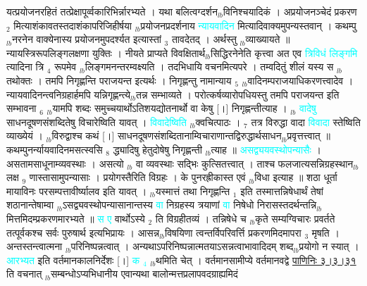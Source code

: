 \documentclass[article,12pt,a4paper]{memoir}%
\newcommand{\quotelemma}[1]{\textcolor{cyan}{#1}}
\begin{document}
	  
	  \pstart \leavevmode%
	यत्प्रयोजनरहितं तत्प्रेक्षापूर्व्वकारिभिर्न्नारभ्यते । यथा बलित्वग्दर्शन{\tiny $_{lb}$}विनिश्चयादिकं । अप्रयोजनञ्चेदं प्रकरण {\tiny $_{2}$} मित्याशंकावतस्तदाशंकापरिजिहीर्षया {\tiny $_{lb}$}प्रयोजनप्रदर्शनाय \quotelemma{न्यायवादिन} \cite[1b1]{vn-msN} मित्यादिवाक्यमुपन्यस्तवान् । कथम्पु{\tiny $_{lb}$}नरनेन वाक्येनास्य प्रयोजनमुपदर्श्यत इत्यास्तां {\tiny $_{3}$} तावदेतद् । अर्थस्तु {\tiny $_{lb}$}व्याख्यायते ॥ न्यायस्त्रिरूपलिङ्गलक्षणा युक्तिः । नीयते प्राप्यते विवक्षितार्थ{\tiny $_{lb}$}सिद्धिरनेनेति कृत्त्वा अत एव \quotelemma{त्रिविधं लिङ्गमि}\cite[1b2]{vn-msN} त्यादिना त्रि {\tiny $_{4}$} रूपमेव {\tiny $_{lb}$}लिङ्गमनन्तरम्वक्ष्यति । तदभिधायि वचनमित्यपरे । तम्वदितुं शीलं यस्य स {\tiny $_{lb}$}तथोक्तः । तमपि निगृह्णन्ति पराजयन्त इत्यर्थः । निगृह्णन्तु नामान्याय {\tiny $_{5}$} {\tiny $_{lb}$}वादिनम्पराजयाधिकरणत्त्वादेव । न्यायवादिनन्त्वनिग्रहार्हमपि यन्निगृह्णन्त्ये{\tiny $_{lb}$}तन्न सम्भाव्यते । परोत्कर्षव्यारोपधियस्तु तमपि पराजयन्त इति सम्भावना {\tiny $_{6}$} {\tiny $_{lb}$}यामपि शब्दः समुच्चयार्थोऽतिशयद्योतनार्थो वा केषु [।] निगृह्णन्तीत्याह । {\tiny $_{lb}$} \quotelemma{वादेषु} \cite[1b1]{vn-msN} साधनदूषणसंशब्दितेषु विचारेष्विति यावत् । \quotelemma{विवादेष्विति} {\tiny $_{lb}$}क्वचित्पाठः । {\tiny $_{7}$} तत्र विरुद्धा वादा \quotelemma{विवादा} स्तेष्विति व्याख्येयं । {\tiny $_{lb}$}विरुद्वाश्च कथं [।] साधनदूषणसंशब्दितानाम्विचाराणान्तद्विरुद्धार्थसाधन{\tiny $_{lb}$}प्रवृत्तत्त्वात् ॥ कथम्पुनर्न्यायवादिनमसत्स्वसि {\tiny $_{8}$} द्ध्यादिषु हेतुदोषेषु निगृह्णन्ती {\tiny $_{lb}$}त्याह ॥ \quotelemma{असद्व्ययवस्थोपन्यासैः} । \cite[1b1]{vn-msN} असतामसाधूनाम्व्यवस्थाः । असत्यो {\tiny $_{lb}$} \leavevmode{} वा व्यवस्थाः सद्भिः कुत्सितत्त्वात् । ताश्च फलजात्यसन्निग्रहस्थान{\tiny $_{lb}$}लक्ष {\tiny $_{9}$}\leavevmode{} णास्तासामुपन्यासाः । प्रयोगस्तैरिति विग्रहः । के पुनरह्रीकास्त एवं {\tiny $_{lb}$}विधा इत्याह ॥ शठा धूर्ता मायाविनः परसम्पत्तावीर्ष्यालव इति यावत् । {\tiny $_{lb}$}यस्मात्तं तथा निगृह्णन्ति {\tiny $_{1}$} इति तस्मात्तन्निषेधार्थं तेषां शठानान्तेषाम्वा {\tiny $_{lb}$}ऽसद्व्यवस्थोपन्यासानान्तस्य \quotelemma{वा} निग्रहस्य त्रयाणां \quotelemma{वा} निषेधो निरासस्तदर्थन्तन्नि{\tiny $_{lb}$}मित्तमिदम्प्रकरणमारभ्यते ॥ \quotelemma{स ए} वार्थोऽस्ये {\tiny $_{2}$} ति विग्रहीतव्यं । तन्निषेधे च {\tiny $_{lb}$}कृते सम्यग्विचारः प्रवर्तते तत्पूर्वकश्च सर्वः पुरुषार्थ इत्यभिप्रायः । आसन्न{\tiny $_{lb}$}विषयिणा त्वन्तर्विपरिवर्त्ति प्रकरणमिदमापरा {\tiny $_{3}$} मृषति । अन्तस्तन्त्वात्मना {\tiny $_{lb}$}परिनिष्पन्नत्वात् । अन्यथाऽपरिनिष्पन्नात्मतयाऽसन्नत्वाभावादिदम् शब्द{\tiny $_{lb}$}प्रयोगो न स्यात् । \quotelemma{आरभ्यत} \cite[1b1]{vn-msN} इति वर्तमानकालनिर्देशः [।] \quotelemma{क {\tiny $_{4}$}} {\tiny $_{lb}$}थमिति चेत् । वर्तमानसामीप्ये वर्तमानवद्वे \href{http://sarit.indology.info/?cref=P\%C4\%81.3.3.31}{पाणिनिः ३।३।३१} ति वचनात् {\tiny $_{lb}$}सम्बन्धोऽप्यभिधानीय एवान्यथा बालोन्मत्तप्रलापवदग्राह्यमिदं 
\end{document}
